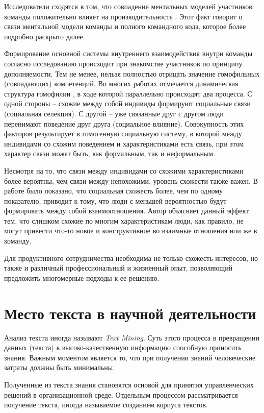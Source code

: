 Исследователи сходятся в том, что совпадение ментальных моделей участников команды положительно влияет на производительность \cite{lim2006team, mathieu2000influence}. 
Этот факт говорит о связи ментальной модели команды и полного командного кода, которое более подробно раскрыто далее. 

Формирование основной системы внутреннего взаимодействия внутри команды согласно исследованию \cite{harper1985power} происходит при знакомстве участников по принципу дополняемости.
Тем не менее, нельзя полностью отрицать значение гомофильных (совпадающих) компетенций. 
Во многих работах отмечается динамическая структура гомофилии \cite{mcpherson2001birds, snijders2010introduction, steglich20108}, в ходе которой параллельно происходят два процесса. 
С одной стороны – схожие между собой индивиды формируют социальные связи (социальная селекция). 
С другой – уже связанные друг с другом люди перенимают поведение друг друга (социальное влияние). 
Совокупность этих факторов результирует в гомогенную социальную систему, 
в которой между индивидами со схожим поведением и характеристиками есть связь, при этом характер связи может быть, как формальным, так и неформальным.                     

Несмотря на то, что связи между индивидами со схожими характеристиками более вероятны, чем связи между непохожими, уровень схожести также важен. 
В работе \cite{block2014multidimensional} было показано, что социальная схожесть более, чем по одному показателю, 
приводит к тому, что люди с меньшей вероятностью будут формировать между собой взаимоотношения. 
Автор объясняет данный эффект тем, что слишком схожие по многим характеристикам люди, как правило, 
не могут привести что-то новое и конструктивное во взаимные отношения или же в команду. 

Для продуктивного сотрудничества необходима не только схожесть интересов, 
но также и различный профессиональный и жизненный опыт, позволяющий предложить многомерные подходы к ее решению.

\section{Место текста в научной деятельности}
Анализ текста иногда называют \textit{Text Mining}. Суть этого процесса в превращении данных (текста) в высоко-качественную информацию способную приносить знания. Важным моментом является то, что при получении знаний человеческие затраты должны быть минимальны. 

Полученные из текста знания становятся основой для принятия управленческих решений в организационной среде. 
Отдельным процессом рассматривается получение текста, иногда называемое созданием корпуса текстов. 

